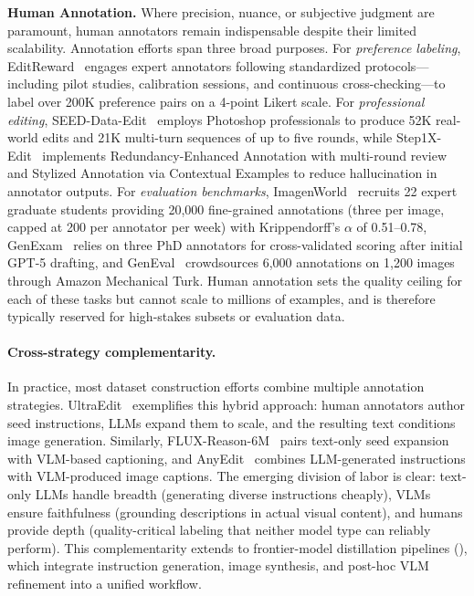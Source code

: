 \documentclass{llmxive}
\begin{document}
\textbf{Human Annotation.}
Where precision, nuance, or subjective judgment are paramount, human annotators remain indispensable despite their limited scalability. Annotation efforts span three broad purposes. For \emph{preference labeling}, EditReward~\citep{wu2025editreward} engages expert annotators following standardized protocols---including pilot studies, calibration sessions, and continuous cross-checking---to label over 200K preference pairs on a 4-point Likert scale. For \emph{professional editing}, SEED-Data-Edit~\citep{ge2024seed} employs Photoshop professionals to produce 52K real-world edits and 21K multi-turn sequences of up to five rounds, while Step1X-Edit~\citep{liu2025step1x} implements Redundancy-Enhanced Annotation with multi-round review and Stylized Annotation via Contextual Examples to reduce hallucination in annotator outputs. For \emph{evaluation benchmarks}, ImagenWorld~\citep{sani2026imagenworld} recruits 22 expert graduate students providing 20,000 fine-grained annotations (three per image, capped at 200 per annotator per week) with Krippendorff's $\alpha$ of 0.51--0.78, GenExam~\citep{wang2025genexam} relies on three PhD annotators for cross-validated scoring after initial GPT-5 drafting, and GenEval~\citep{ghosh2023geneval} crowdsources 6,000 annotations on 1,200 images through Amazon Mechanical Turk. Human annotation sets the quality ceiling for each of these tasks but cannot scale to millions of examples, and is therefore typically reserved for high-stakes subsets or evaluation data.

\paragraph{Cross-strategy complementarity.}
In practice, most dataset construction efforts combine multiple annotation strategies. UltraEdit~\citep{zhao2024ultraedit} exemplifies this hybrid approach: human annotators author seed instructions, LLMs expand them to scale, and the resulting text conditions image generation. Similarly, FLUX-Reason-6M~\citep{fang2025flux} pairs text-only seed expansion with VLM-based captioning, and AnyEdit~\citep{yu2025anyedit} combines LLM-generated instructions with VLM-produced image captions. The emerging division of labor is clear: text-only LLMs handle breadth (generating diverse instructions cheaply), VLMs ensure faithfulness (grounding descriptions in actual visual content), and humans provide depth (quality-critical labeling that neither model type can reliably perform). This complementarity extends to frontier-model distillation pipelines (), which integrate instruction generation, image synthesis, and post-hoc VLM refinement into a unified workflow.
\end{document}
